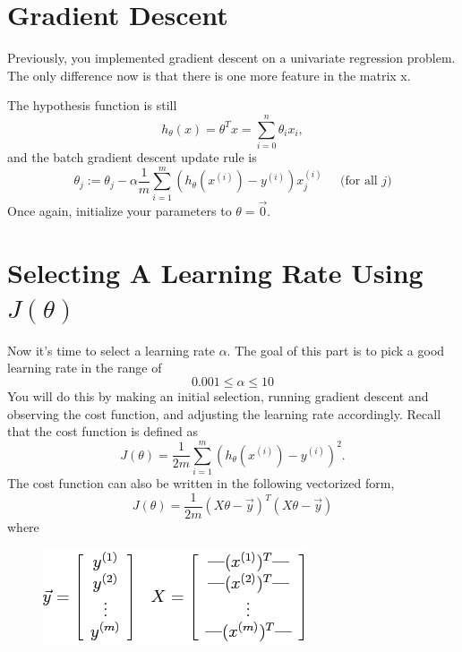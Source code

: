 \documentclass[10pt,a4paper]{article}
\begin{document}
\section{Gradient Descent}
%
  Previously, you implemented gradient descent on a univariate regression problem. The only difference now is that there is one more feature in the matrix x.

  The hypothesis function is still 
  \begin{displaymath}
    h_{\theta}(x) = \theta^Tx = \sum_{i=0}^n \theta_i x_i, \nonumber
  \end{displaymath}
  and the batch gradient descent update rule is
  \begin{displaymath}
    \theta_j := \theta_j - \alpha \frac{1}{m} \sum_{i=1}^m (h_\theta(x^{(i)}) - y^{(i)}) x_j^{(i)} \;\;\;\;\;\mbox{(for all $j$)} \nonumber
  \end{displaymath}  
  Once again, initialize your parameters to  $\theta = \vec{0}$.



\section{Selecting A Learning Rate Using $J(\theta)$}
%
  Now it's time to select a learning rate $\alpha.$ The goal of this part is to pick a good learning rate in the range of 
  \[ 0.001 \leq \alpha \leq 10 \]
  You will do this by making an initial selection, running gradient descent and observing the cost function, and adjusting the learning rate accordingly. Recall that the cost function is defined as
  \begin{displaymath}
    J(\theta)=\frac{1}{2m}\sum_{i=1}^{m}\left(h_{\theta}(x^{(i)})-y^{(i)}\right)^{2}. \nonumber
  \end{displaymath}
  The cost function can also be written in the following vectorized form,
  \begin{displaymath}
    J(\theta) = \frac{1}{2m}\left(X\theta-\vec{y}\right)^{T}(X\theta-\vec{y}) \nonumber
  \end{displaymath}  
  where
  \begin{figure}[htb!]
    \centering
      \includegraphics[width=.5\columnwidth]{img2-1}
  \end{figure}
\end{document}
